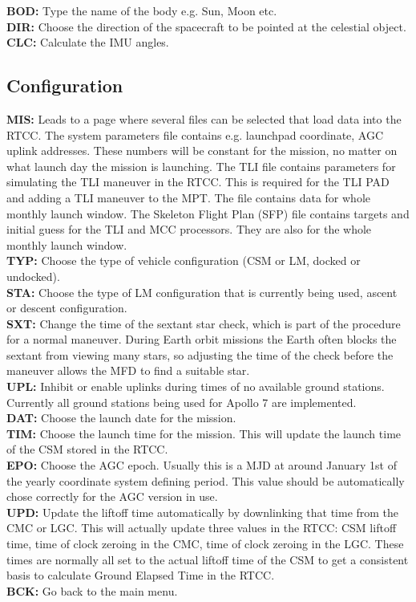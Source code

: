 \documentclass[11pt]{article} %
\begin{document}
\textbf{BOD:} Type the name of the body e.g. Sun, Moon etc.\\
\textbf{DIR:} Choose the direction of the spacecraft to be pointed at the celestial object.\\
\textbf{CLC:} Calculate the IMU angles.\\

\subsection{Configuration}

\textbf{MIS:} Leads to a page where several files can be selected that load data into the RTCC. The system parameters file contains e.g. launchpad coordinate, AGC uplink addresses. These numbers will be constant for the mission, no matter on what launch day the mission is launching. The TLI file contains parameters for simulating the TLI maneuver in the RTCC. This is required for the TLI PAD and adding a TLI maneuver to the MPT. The file contains data for whole monthly launch window. The Skeleton Flight Plan (SFP) file contains targets and initial guess for the TLI and MCC processors. They are also for the whole monthly launch window.\\
\textbf{TYP:} Choose the type of vehicle configuration (CSM or LM, docked or undocked).\\
\textbf{STA:} Choose the type of LM configuration that is currently being used, ascent or descent configuration.\\
\textbf{SXT:} Change the time of the sextant star check, which is part of the procedure for a normal maneuver. During Earth orbit missions the Earth often blocks the sextant from viewing many stars, so adjusting the time of the check before the maneuver allows the MFD to find a suitable star.\\
\textbf{UPL:} Inhibit or enable uplinks during times of no available ground stations. Currently all ground stations being used for Apollo 7 are implemented.\\
\textbf{DAT:} Choose the launch date for the mission.\\
\textbf{TIM:} Choose the launch time for the mission. This will update the launch time of the CSM stored in the RTCC.\\
\textbf{EPO:} Choose the AGC epoch. Usually this is a MJD at around January 1st of the yearly coordinate system defining period. This value should be automatically chose correctly for the AGC version in use.\\
\textbf{UPD:} Update the liftoff time automatically by downlinking that time from the CMC or LGC. This will actually update three values in the RTCC: CSM liftoff time, time of clock zeroing in the CMC, time of clock zeroing in the LGC. These times are normally all set to the actual liftoff time of the CSM to get a consistent basis to calculate Ground Elapsed Time in the RTCC.\\
\textbf{BCK:} Go back to the main menu.\\
\end{document}
